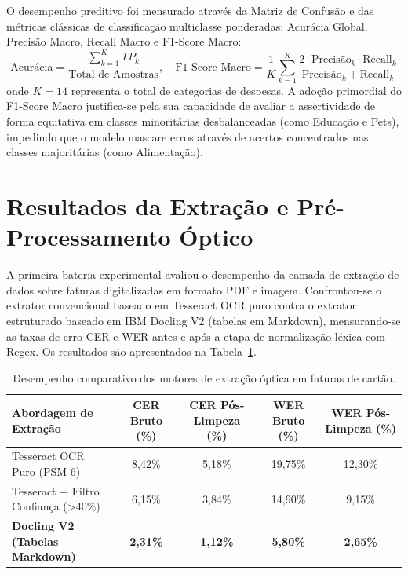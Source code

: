 \documentclass[
	12pt,				
	openright,			
	oneside,			
	a4paper,			
	english,			
	brazil				
	]{abntex2}
\begin{document}
O desempenho preditivo foi mensurado através da Matriz de Confusão e das métricas clássicas de classificação multiclasse ponderadas: Acurácia Global, Precisão Macro, Recall Macro e F1-Score Macro:
\begin{equation}
    \text{Acurácia} = \frac{\sum_{k=1}^{K} TP_k}{\text{Total de Amostras}}, \quad
    \text{F1-Score Macro} = \frac{1}{K} \sum_{k=1}^{K} \frac{2 \cdot \text{Precisão}_k \cdot \text{Recall}_k}{\text{Precisão}_k + \text{Recall}_k}
\end{equation}
onde $K = 14$ representa o total de categorias de despesas. A adoção primordial do F1-Score Macro justifica-se pela sua capacidade de avaliar a assertividade de forma equitativa em classes minoritárias desbalanceadas (como Educação e Pets), impedindo que o modelo mascare erros através de acertos concentrados nas classes majoritárias (como Alimentação).

\section{Resultados da Extração e Pré-Processamento Óptico}
\label{sec:val_resultados_ocr}

A primeira bateria experimental avaliou o desempenho da camada de extração de dados sobre faturas digitalizadas em formato PDF e imagem. Confrontou-se o extrator convencional baseado em Tesseract OCR puro contra o extrator estruturado baseado em IBM Docling V2 (tabelas em Markdown), mensurando-se as taxas de erro CER e WER antes e após a etapa de normalização léxica com Regex. Os resultados são apresentados na Tabela~\ref{tab:resultados_ocr}.

\begin{table}[htb]
    \centering
    \caption{Desempenho comparativo dos motores de extração óptica em faturas de cartão.}
    \label{tab:resultados_ocr}
    \begin{tabular}{lcccc}
        \toprule
        \textbf{Abordagem de Extração} & \textbf{CER Bruto (\%)} & \textbf{CER Pós-Limpeza (\%)} & \textbf{WER Bruto (\%)} & \textbf{WER Pós-Limpeza (\%)} \\
        \midrule
        Tesseract OCR Puro (PSM 6) & 8,42\% & 5,18\% & 19,75\% & 12,30\% \\
        Tesseract + Filtro Confiança (>40\%) & 6,15\% & 3,84\% & 14,90\% & 9,15\% \\
        \textbf{Docling V2 (Tabelas Markdown)} & \textbf{2,31\%} & \textbf{1,12\%} & \textbf{5,80\%} & \textbf{2,65\%} \\
        \bottomrule
    \end{tabular}
\end{table}
\end{document}
